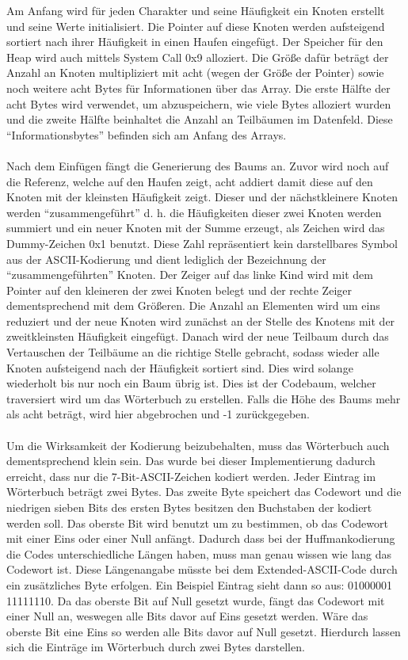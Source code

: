 \documentclass[course=erap]{aspdoc}
\begin{document}
Am Anfang wird für jeden Charakter und seine Häufigkeit ein Knoten erstellt und seine Werte initialisiert. Die Pointer auf diese Knoten werden aufsteigend sortiert nach ihrer Häufigkeit in einen Haufen eingefügt. Der Speicher für den Heap wird auch mittels System Call 0x9 alloziert. Die Größe dafür beträgt der Anzahl an Knoten multipliziert mit acht (wegen der Größe der Pointer) sowie noch weitere acht Bytes für Informationen über das Array. Die erste Hälfte der acht Bytes wird verwendet, um abzuspeichern, wie viele Bytes alloziert wurden und die zweite Hälfte beinhaltet die Anzahl an Teilbäumen im Datenfeld. Diese \enquote{Informationsbytes} befinden sich am Anfang des Arrays.\\\\
Nach dem Einfügen fängt die Generierung des Baums an. Zuvor wird noch auf die Referenz, welche auf den Haufen zeigt, acht addiert damit diese auf den Knoten mit der kleinsten Häufigkeit zeigt. Dieser und der nächstkleinere Knoten werden \enquote{zusammengeführt}\cite{codierungUndKryptologieSpringer} d. h. die Häufigkeiten dieser zwei Knoten werden summiert und ein neuer Knoten mit der Summe erzeugt, als Zeichen wird das Dummy-Zeichen 0x1 benutzt. Diese Zahl repräsentiert kein darstellbares Symbol aus der ASCII-Kodierung und dient lediglich der Bezeichnung der \enquote{zusammengeführten}\cite{codierungUndKryptologieSpringer} Knoten. Der Zeiger auf das linke Kind wird mit dem Pointer auf den kleineren der zwei Knoten belegt und der rechte Zeiger dementsprechend mit dem Größeren. Die Anzahl an Elementen wird um eins reduziert und der neue Knoten wird zunächst an der Stelle des Knotens mit der zweitkleinsten Häufigkeit eingefügt. Danach wird der neue Teilbaum durch das Vertauschen der Teilbäume an die richtige Stelle gebracht, sodass wieder alle Knoten aufsteigend nach der Häufigkeit sortiert sind. Dies wird solange wiederholt bis nur noch ein Baum übrig ist.  Dies ist der Codebaum, welcher traversiert wird um das Wörterbuch zu erstellen. Falls die Höhe des Baums mehr als acht beträgt, wird hier abgebrochen und -1 zurückgegeben.\\\\
Um die Wirksamkeit der Kodierung beizubehalten, muss das Wörterbuch auch dementsprechend klein sein.\cite{grundkursCodierungSpringer} Das wurde bei dieser Implementierung dadurch erreicht, dass nur die 7-Bit-ASCII-Zeichen kodiert werden. Jeder Eintrag im Wörterbuch beträgt zwei Bytes. Das zweite Byte speichert das Codewort und die niedrigen sieben Bits des ersten Bytes besitzen den Buchstaben der kodiert werden soll. Das oberste Bit wird benutzt um zu bestimmen, ob das Codewort mit einer Eins oder einer Null anfängt. Dadurch dass bei der Huffmankodierung die Codes unterschiedliche Längen haben, muss man genau wissen wie lang das Codewort ist. Diese Längenangabe müsste bei dem Extended-ASCII-Code durch ein zusätzliches Byte erfolgen. Ein Beispiel Eintrag sieht dann so aus: 01000001 11111110. Da das oberste Bit auf Null gesetzt wurde, fängt das Codewort mit einer Null an, weswegen alle Bits davor auf Eins gesetzt werden. Wäre das oberste Bit eine Eins so werden alle Bits davor auf Null gesetzt. Hierdurch lassen sich die Einträge im Wörterbuch durch zwei Bytes darstellen.
\end{document}
